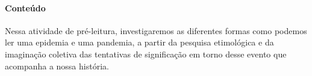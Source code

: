 \documentclass[12pt]{extarticle}
\begin{document}



\paragraph{Conteúdo}

Nessa atividade de pré-leitura, investigaremos as diferentes formas como
podemos ler uma epidemia e uma pandemia, a partir da pesquisa
etimológica e da imaginação coletiva das tentativas de significação em
torno desse evento que acompanha a nossa história.
\end{document}
